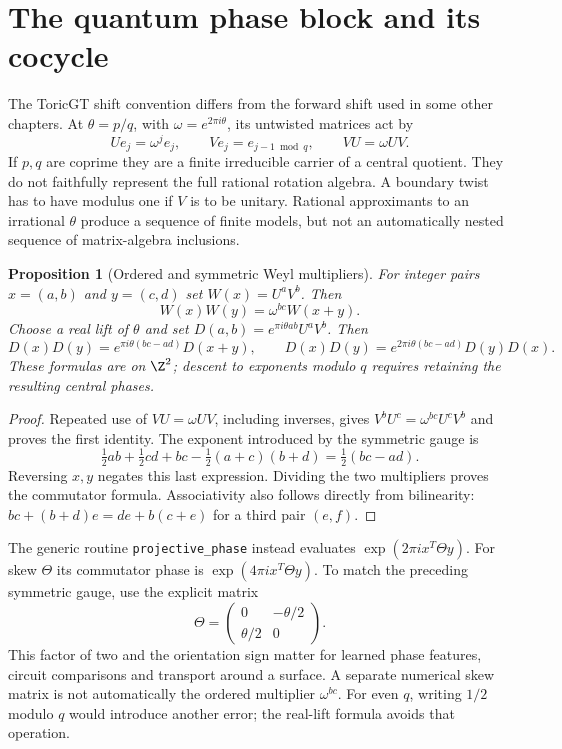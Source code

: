 \documentclass[11pt,oneside,openany]{book}
\newtheorem{proposition}[theorem]{Proposition}
\theoremstyle{definition}\newtheorem{definition}[theorem]{Definition}
\theoremstyle{remark}\newtheorem{remark}[theorem]{Remark}
\begin{document}
\section{The quantum phase block and its cocycle}
The ToricGT shift convention differs from the forward shift used in some
other chapters. At $\theta=p/q$, with $\omega=e^{2\pi i\theta}$, its
untwisted matrices act by
\[
 Ue_j=\omega^je_j,\qquad Ve_j=e_{j-1\bmod q},\qquad
 VU=\omega UV.
\]
If $p,q$ are coprime they are a finite irreducible carrier of a central
quotient. They do not faithfully represent the full rational rotation
algebra. A boundary twist has to have modulus one if $V$ is to be
unitary. Rational approximants to an irrational $\theta$ produce a
sequence of finite models, but not an automatically nested sequence of
matrix-algebra inclusions.

\begin{proposition}[Ordered and symmetric Weyl multipliers]\label{tg:cocycle}
For integer pairs $x=(a,b)$ and $y=(c,d)$ set
$W(x)=U^aV^b$. Then
\[
 W(x)W(y)=\omega^{bc}W(x+y).
\]
Choose a real lift of $\theta$ and set
$D(a,b)=e^{\pi i\theta ab}U^aV^b$. Then
\[
 D(x)D(y)=e^{\pi i\theta(bc-ad)}D(x+y),\qquad
 D(x)D(y)=e^{2\pi i\theta(bc-ad)}D(y)D(x).
\]
These formulas are on $\Z^2$; descent to exponents modulo $q$ requires
retaining the resulting central phases.
\end{proposition}
\begin{proof}
Repeated use of $VU=\omega UV$, including inverses, gives
$V^bU^c=\omega^{bc}U^cV^b$ and proves the first identity.
The exponent introduced by the symmetric gauge is
\[
 \tfrac12ab+\tfrac12cd+bc-\tfrac12(a+c)(b+d)
 =\tfrac12(bc-ad).
\]
Reversing $x,y$ negates this last expression. Dividing the two multipliers
proves the commutator formula. Associativity also follows directly from
bilinearity: $bc+(b+d)e=de+b(c+e)$ for a third pair $(e,f)$.
\end{proof}

The generic routine \texttt{projective\_phase} instead evaluates
$\exp(2\pi i x^T\Theta y)$. For skew $\Theta$ its commutator phase
is $\exp(4\pi i x^T\Theta y)$. To match the preceding symmetric gauge,
use the explicit matrix
\[
 \Theta=\begin{pmatrix}0&-\theta/2\\\theta/2&0\end{pmatrix}.
\]
This factor of two and the orientation sign matter for learned phase
features, circuit comparisons and transport around a surface. A separate
numerical skew matrix is not automatically the ordered multiplier
$\omega^{bc}$. For even $q$, writing $1/2$ modulo $q$ would introduce
another error; the real-lift formula avoids that operation.
\end{document}
